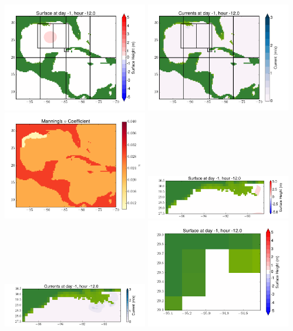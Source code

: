 \documentclass[11pt]{article}
\begin{document}
\vskip 10pt 
\includegraphics[width=0.475\textwidth]{frame0036fig1.png}
\includegraphics[width=0.475\textwidth]{frame0036fig2.png}
\vskip 10pt 
\includegraphics[width=0.475\textwidth]{frame0036fig3.png}
\includegraphics[width=0.475\textwidth]{frame0036fig4.png}
\vskip 10pt 
\includegraphics[width=0.475\textwidth]{frame0036fig5.png}
\includegraphics[width=0.475\textwidth]{frame0036fig6.png}
\end{document}
